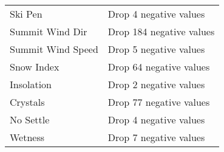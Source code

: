 \begin{table}[h]
\begin{tabular}{ll}
Ski Pen & Drop 4 negative values \\
Summit Wind Dir & Drop 184 negative values \\
Summit Wind Speed & Drop 5 negative values \\
Snow Index & Drop 64 negative values \\
Insolation & Drop 2 negative values \\
Crystals & Drop 77 negative values \\
No Settle & Drop 4 negative values \\
Wetness & Drop 7 negative values \\
\bottomrule
\end{tabular}
\end{table}
